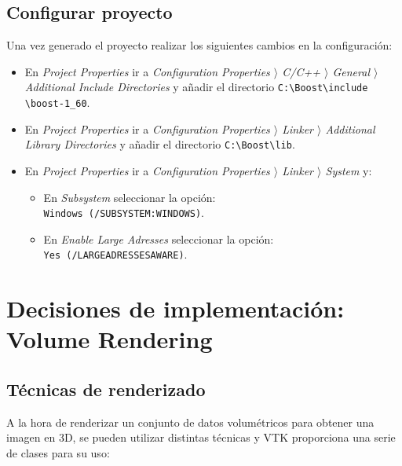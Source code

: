 \subsection{Configurar proyecto}

Una vez generado el proyecto realizar los siguientes cambios en la configuración: 
\begin{itemize}
	\item En \textit{Project Properties} ir a \textit{Configuration Properties $ \rangle $ C/C++ $ \rangle $ General $ \rangle $ Additional Include Directories} y añadir el directorio \texttt{C:\textbackslash Boost\textbackslash include \\ \textbackslash boost-1\_60}.
	\item En \textit{Project Properties} ir a \textit{Configuration Properties $ \rangle $ Linker $ \rangle $ Additional Library Directories} y añadir el directorio \texttt{C:\textbackslash Boost\textbackslash lib}.
	\item En \textit{Project Properties} ir a \textit{Configuration Properties $ \rangle $ Linker $ \rangle $ System} y:
	\begin{itemize}
		\item En \textit{Subsystem} seleccionar la opción: \\ \texttt{Windows (/SUBSYSTEM:WINDOWS)}.
		\item  En \textit{Enable Large Adresses} seleccionar la opción: \\ \texttt{Yes (/LARGEADRESSESAWARE)}.
	\end{itemize}
\end{itemize}

\section{Decisiones de implementación: Volume Rendering}

\subsection{Técnicas de renderizado}

A la hora de renderizar un conjunto de datos volumétricos para obtener una imagen en 3D, se pueden utilizar distintas técnicas y VTK proporciona una serie de clases para su uso:

